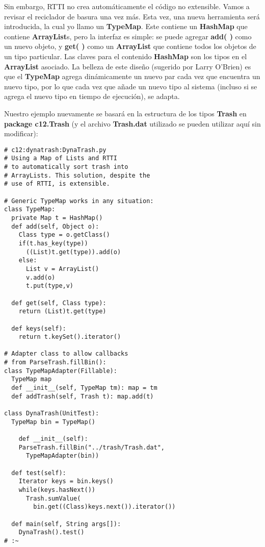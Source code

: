 Sin embargo, RTTI no crea automáticamente el código no extensible. Vamos a revisar el reciclador de basura una vez más. Esta vez, una nueva herramienta será introducida, la cual yo llamo un \textbf{TypeMap}. Este contiene un \textbf{HashMap} que contiene \textbf{ArrayList}s, pero la interfaz es simple: se puede agregar \textbf{add( )} como un nuevo objeto, y \textbf{get( )} como un \textbf{ArrayList} que contiene todos los objetos de un tipo particular. Las claves para el contenido \textbf{HashMap} son los tipos en el \textbf{ArrayList} asociado. La belleza de este diseño (sugerido por Larry O'Brien) es que el \textbf{TypeMap} agrega dinámicamente un nuevo par cada vez que encuentra un nuevo tipo, por lo que cada vez que añade un nuevo tipo al sistema (incluso si se agrega el nuevo tipo en tiempo de ejecución), se adapta.  \newline

Nuestro ejemplo  nuevamente se basará en la estructura de los tipos \textbf{Trash} en \textbf{package c12.Trash} (y el archivo \textbf{Trash.dat} utilizado se pueden utilizar aquí sin modificar):        \newline

\begin{lstlisting} 
# c12:dynatrash:DynaTrash.py  
# Using a Map of Lists and RTTI 
# to automatically sort trash into 
# ArrayLists. This solution, despite the 
# use of RTTI, is extensible. 

# Generic TypeMap works in any situation: 
class TypeMap: 
  private Map t = HashMap() 
  def add(self, Object o): 
    Class type = o.getClass() 
    if(t.has_key(type)) 
      ((List)t.get(type)).add(o) 
    else: 
      List v = ArrayList() 
      v.add(o) 
      t.put(type,v) 
      
  def get(self, Class type): 
    return (List)t.get(type) 
    
  def keys(self):  
    return t.keySet().iterator()  
    
# Adapter class to allow callbacks 
# from ParseTrash.fillBin(): 
class TypeMapAdapter(Fillable): 
  TypeMap map 
  def __init__(self, TypeMap tm): map = tm  
  def addTrash(self, Trash t): map.add(t)  
  
class DynaTrash(UnitTest): 
  TypeMap bin = TypeMap() 
  
    def __init__(self): 
    ParseTrash.fillBin("../trash/Trash.dat",  
      TypeMapAdapter(bin)) 
      
  def test(self): 
    Iterator keys = bin.keys() 
    while(keys.hasNext()) 
      Trash.sumValue( 
        bin.get((Class)keys.next()).iterator())
        
  def main(self, String args[]): 
    DynaTrash().test() 
# :~ 
\end{lstlisting}

